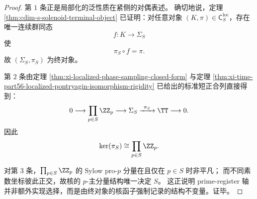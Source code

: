 \begin{proof}
第 \(1\) 条正是局部化的泛性质在紧侧的对偶表述。
确切地说，定理 \ref{thm:cdim-s-solenoid-terminal-object} 已证明：对任意对象 \((K,\pi)\in\mathsf C_S^{\mathrm{loc}}\)，存在唯一连续群同态
\[
f:K\longrightarrow \Sigma_S
\]
使
\[
\pi_S\circ f=\pi.
\]
故 \((\Sigma_S,\pi_S)\) 为终对象。

第 \(2\) 条由定理 \ref{thm:xi-localized-phase-sampling-closed-form} 与定理 \ref{thm:xi-time-part56-localized-pontryagin-isomorphism-rigidity} 已给出的标准短正合列直接得到：
\[
0\longrightarrow \prod_{p\in S}\ZZ_p
\longrightarrow \Sigma_S
\xrightarrow{\ \pi_S\ }
\TT
\longrightarrow 0.
\]
因此
\[
\ker(\pi_S)\cong \prod_{p\in S}\ZZ_p.
\]

对第 \(3\) 条，\(\prod_{p\in S}\ZZ_p\) 的 Sylow pro-\(p\) 分量在且仅在 \(p\in S\) 时非平凡；
而不同素数坐标彼此正交，故核的 \(p\)-主分量结构唯一决定 \(S\)。
这正说明 prime-register 轴并非额外实现选择，而是由终对象的核函子强制记录的结构不变量。证毕。
\end{proof}
